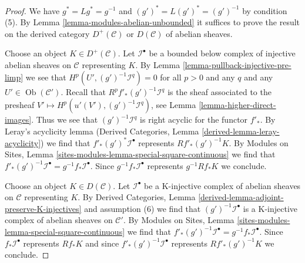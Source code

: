 \documentclass[10pt,a4paper]{amsart}
\theoremstyle{plain}
\theoremstyle{definition}
\theoremstyle{remark}
\numberwithin{equation}{subsection}
\def\Ob{\mathop{\mathrm{Ob}}\nolimits}
\begin{document}
\begin{proof}
We have $g^* = Lg^* = g^{-1}$ and $(g')^* = L(g')^* = (g')^{-1}$
by condition (5).
By Lemma \ref{lemma-modules-abelian-unbounded} it suffices
to prove the result on the derived category $D^+(\mathcal{C})$ or
$D(\mathcal{C})$ of abelian sheaves.

\medskip\noindent
Choose an object $K \in D^+(\mathcal{C})$.
Let $\mathcal{I}^\bullet$ be a bounded below complex of injective abelian
sheaves on $\mathcal{C}$ representing $K$. By
Lemma \ref{lemma-pullback-injective-pre-limp}
we see that $H^p(U', (g')^{-1}\mathcal{I}^q) = 0$ for
all $p > 0$ and any $q$ and any $U' \in \Ob(\mathcal{C}')$.
Recall that $R^pf'_*(g')^{-1}\mathcal{I}^q$ is the sheaf
associated to the presheaf $V' \mapsto H^p(u'(V'), (g')^{-1}\mathcal{I}^q)$,
see Lemma \ref{lemma-higher-direct-images}.
Thus we see that $(g')^{-1}\mathcal{I}^q$ is right acyclic
for the functor $f'_*$. By Leray's acyclicity lemma
(Derived Categories, Lemma \ref{derived-lemma-leray-acyclicity})
we find that $f'_*(g')^*\mathcal{I}^\bullet$
represents $Rf'_*(g')^{-1}K$.
By Modules on Sites, Lemma
\ref{sites-modules-lemma-special-square-continuous}
we find that $f'_*(g')^{-1}\mathcal{I}^\bullet = g^{-1}f_*\mathcal{I}^\bullet$.
Since $g^{-1}f_*\mathcal{I}^\bullet$ represents $g^{-1}Rf_*K$
we conclude.

\medskip\noindent
Choose an object $K \in D(\mathcal{C})$.
Let $\mathcal{I}^\bullet$ be a K-injective complex of abelian
sheaves on $\mathcal{C}$ representing $K$. By
Derived Categories, Lemma \ref{derived-lemma-adjoint-preserve-K-injectives}
and assumption (6) we find that $(g')^{-1}\mathcal{I}^\bullet$
is a K-injective complex of abelian sheaves on $\mathcal{C}'$.
By Modules on Sites, Lemma
\ref{sites-modules-lemma-special-square-continuous}
we find that $f'_*(g')^{-1}\mathcal{I}^\bullet = g^{-1}f_*\mathcal{I}^\bullet$.
Since $f_*\mathcal{I}^\bullet$ represents $Rf_*K$ and since
$f'_*(g')^{-1}\mathcal{I}^\bullet$ represents $Rf'_*(g')^{-1}K$
we conclude.
\end{proof}
\end{document}
